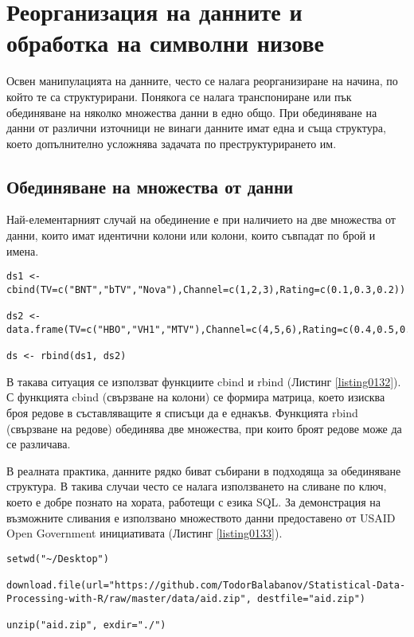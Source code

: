 \newpage
\chapter{Реорганизация на данните и обработка на символни низове}
\label{chapter07}
\thispagestyle{empty}

Освен манипулацията на данните, често се налага реорганизиране на начина, по който те са структурирани. Понякога се налага транспониране или пък обединяване на няколко множества данни в едно общо. При обединяване на данни от различни източници не винаги данните имат една и съща структура, което допълнително усложнява задачата по преструктурирането им.

\section{Обединяване на множества от данни}

Най-елементарният случай на обединение е при наличието на две множества от данни, които имат идентични колони или колони, които съвпадат по брой и имена.

\begin{lstlisting}[caption=Обединяване на множества от данни, label=listing0132]
ds1 <- cbind(TV=c("BNT","bTV","Nova"),Channel=c(1,2,3),Rating=c(0.1,0.3,0.2))

ds2 <- data.frame(TV=c("HBO","VH1","MTV"),Channel=c(4,5,6),Rating=c(0.4,0.5,0.6),stringsAsFactors=FALSE)

ds <- rbind(ds1, ds2)
\end{lstlisting}

В такава ситуация се използват функциите cbind и rbind (Листинг \ref{listing0132}). С функцията cbind (свързване на колони) се формира матрица, което изисква броя редове в съставляващите я списъци да е еднакъв. Функцията rbind (свързване на редове) обединява две множества, при които броят редове може да се различава.

В реалната практика, данните рядко биват събирани в подходяща за обединяване структура. В такива случаи често се налага използването на сливане по ключ, което е добре познато на хората, работещи с езика SQL. За демонстрация на възможните сливания е използвано множеството данни предоставено от USAID Open Government инициативата (Листинг \ref{listing0133}).

\begin{lstlisting}[caption=USAID множество от данни, label=listing0133]
setwd("~/Desktop")

download.file(url="https://github.com/TodorBalabanov/Statistical-Data-Processing-with-R/raw/master/data/aid.zip", destfile="aid.zip")

unzip("aid.zip", exdir="./")
\end{lstlisting}

